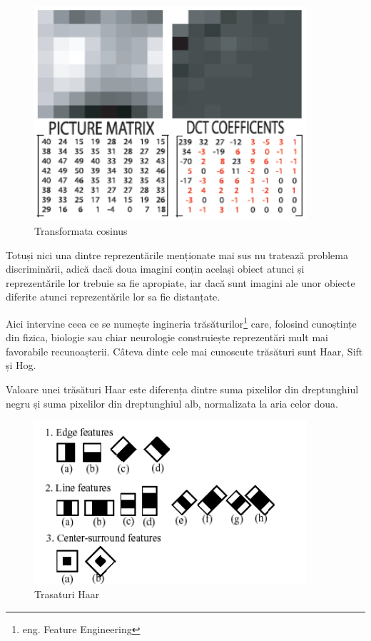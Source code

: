 \begin{figure}[H]
	\centering
		\includegraphics[width=0.90\textwidth]{imagini/take_DCT.png}
	\caption{Transformata cosinus}
	\label{fig:take_DCT}
\end{figure}



Totuși nici una dintre reprezentările menționate mai sus nu tratează problema discriminării, adică dacă doua imagini conțin același obiect atunci și reprezentările lor trebuie sa fie apropiate, iar dacă sunt imagini ale unor obiecte diferite atunci reprezentările lor sa fie distanțate.

Aici intervine ceea ce se numește ingineria trăsăturilor\footnote{eng. Feature Engineering} care, folosind cunoștințe din fizica, biologie sau chiar neurologie construiește reprezentări mult mai favorabile recunoașterii.
Câteva dinte cele mai cunoscute trăsături sunt Haar\cite{Viola01robustreal-time}, Sift\cite{Lowe99objectrecognition} și Hog\cite{Dalal05histogramsof}.

Valoare unei trăsături Haar este diferența dintre suma pixelilor din dreptunghiul negru și suma pixelilor din dreptunghiul alb, normalizata la aria celor doua.
\begin{figure}[H]
	\centering
		\includegraphics[width=0.90\textwidth]{imagini/haarfeatures.png}
	\caption{Trasaturi Haar}
	\label{fig:haarfeatures}
\end{figure}

